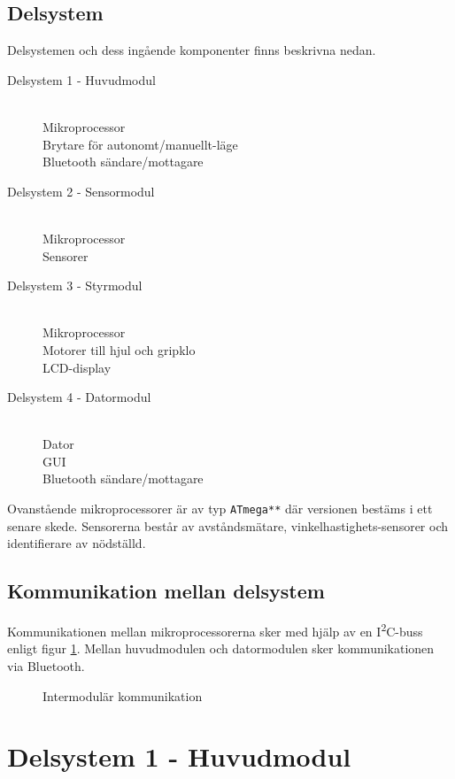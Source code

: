 \documentclass[11pt]{article}
\begin{document}
\begin{flushleft}
\subsection{Delsystem}
Delsystemen och dess ingående komponenter finns beskrivna nedan.
\begin{description}
	\item[Delsystem 1 - Huvudmodul] \hfill \\
	Mikroprocessor \\
	Brytare för autonomt/manuellt-läge \\
	Bluetooth\textsuperscript{\circledR} sändare/mottagare
	\item[Delsystem 2 - Sensormodul] \hfill \\
	Mikroprocessor \\
	Sensorer
	\item[Delsystem 3 - Styrmodul] \hfill \\
	Mikroprocessor \\
	Motorer till hjul och gripklo \\
	LCD-display
	\item[Delsystem 4 - Datormodul] \hfill \\
	Dator \\
	GUI \\
	Bluetooth\textsuperscript{\circledR} sändare/mottagare
\end{description}

Ovanstående mikroprocessorer är av typ \verb+ATmega**+ där versionen bestäms i ett senare skede. Sensorerna består av avståndsmätare, vinkelhastighets-sensorer och identifierare av nödställd. 
\subsection{Kommunikation mellan delsystem}
Kommunikationen mellan mikroprocessorerna sker med hjälp av en I\textsuperscript{2}C-buss enligt figur \ref{communication}. Mellan huvudmodulen och datormodulen sker kommunikationen via Bluetooth\textsuperscript{\circledR}.

\begin{figure}[htbp]
\noindent\resizebox{.97\textwidth}{!}{
		}
	\caption{Intermodulär kommunikation \label{communication}}
\end{figure}

\pagebreak
\section{Delsystem 1 - Huvudmodul}
\label{sec:huvudmodul}


\end{flushleft}
\end{document}
